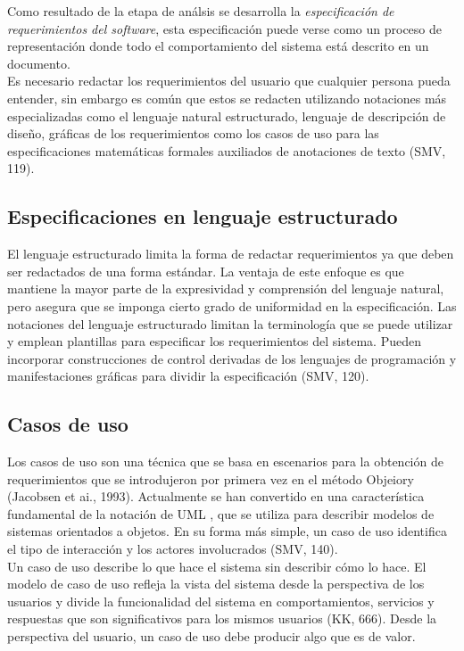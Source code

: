 Como resultado de la etapa de análsis se desarrolla la \emph{especificación de requerimientos del software}, 
esta especificación puede verse como un proceso de representación donde todo el comportamiento del sistema está descrito en un documento.\\

Es necesario redactar los requerimientos del usuario que cualquier persona pueda entender, sin embargo es común que estos se redacten utilizando notaciones
más especializadas como el lenguaje natural estructurado, lenguaje de descripción de diseño, 
gráficas de los requerimientos como los casos de uso para las especificaciones matemáticas formales auxiliados de anotaciones de texto (SMV, 119). 

\subsection{Especificaciones en lenguaje estructurado}
El lenguaje estructurado limita la forma de redactar requerimientos ya que deben ser redactados de una forma estándar. La ventaja de este enfoque es que
mantiene la mayor parte de la expresividad y comprensión del lenguaje natural, pero asegura
que se imponga cierto grado de uniformidad en la especificación. Las notaciones del lenguaje 
estructurado limitan la terminología que se puede utilizar y emplean plantillas para
especificar los requerimientos del sistema. Pueden incorporar construcciones de control
derivadas de los lenguajes de programación y manifestaciones gráficas para dividir la especificación (SMV, 120).\\

\subsection{Casos de uso}
Los casos de uso son una técnica que se basa en escenarios para la obtención de requerimientos que se introdujeron 
por primera vez en el método Objeiory (Jacobsen et ai., 1993).
Actualmente se han convertido en una característica fundamental de la notación de UML , que
se utiliza para describir modelos de sistemas orientados a objetos. En su forma más simple,
un caso de uso identifica el tipo de interacción y los actores involucrados (SMV, 140).\\

Un caso de uso describe lo que hace el sistema sin describir cómo lo hace. El modelo de caso de uso refleja la 
vista del sistema desde la perspectiva de los usuarios y divide la funcionalidad del sistema en comportamientos, servicios y respuestas que son 
significativos para los mismos usuarios (KK, 666). Desde la perspectiva del usuario, un caso de uso debe producir algo que es de valor.\\

